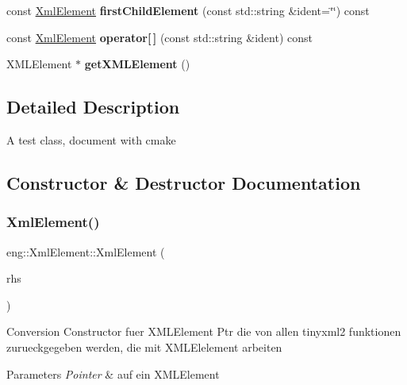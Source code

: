 \begin{DoxyCompactItemize}
const \hyperlink{classeng_1_1_xml_element}{Xml\+Element} {\bfseries first\+Child\+Element} (const std\+::string \&ident=\char`\"{}\char`\"{}) const
\item 
\mbox{\label{classeng_1_1_xml_element_a0a4dd16cf856257a33679c666d0b3377}} 
const \hyperlink{classeng_1_1_xml_element}{Xml\+Element} {\bfseries operator\mbox{[}$\,$\mbox{]}} (const std\+::string \&ident) const
\item 
\mbox{\label{classeng_1_1_xml_element_ac98ea12a51dc393cab79de57ad1b3424}} 
X\+M\+L\+Element $\ast$ {\bfseries get\+X\+M\+L\+Element} ()
\end{DoxyCompactItemize}


\subsection{Detailed Description}
A test class, document with cmake 

\subsection{Constructor \& Destructor Documentation}
\mbox{\label{classeng_1_1_xml_element_aa5d6d580352db5da1a58989084fc2c2d}} 
\subsubsection{\texorpdfstring{Xml\+Element()}{XmlElement()}}
{\footnotesize\ttfamily eng\+::\+Xml\+Element\+::\+Xml\+Element (\begin{DoxyParamCaption}\item[{X\+M\+L\+Element $\ast$}]{rhs }\end{DoxyParamCaption})\hspace{0.3cm}{\ttfamily [inline]}}

Conversion Constructor fuer X\+M\+L\+Element Ptr die von allen tinyxml2 funktionen zurueckgegeben werden, die mit X\+M\+L\+Elelement arbeiten 
\begin{DoxyParams}{Parameters}
{\em Pointer} & auf ein X\+M\+L\+Element \\
\hline
\end{DoxyParams}


